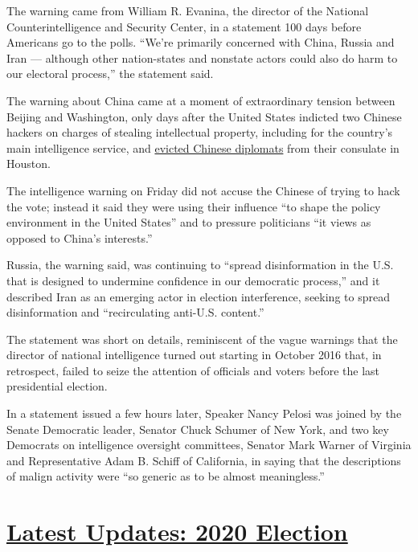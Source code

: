 The warning came from William R. Evanina, the director of the National
Counterintelligence and Security Center, in a statement 100 days before
Americans go to the polls. ``We're primarily concerned with China,
Russia and Iran --- although other nation-states and nonstate actors
could also do harm to our electoral process,'' the statement said.

The warning about China came at a moment of extraordinary tension
between Beijing and Washington, only days after the United States
indicted two Chinese hackers on charges of stealing intellectual
property, including for the country's main intelligence service, and
\href{https://www.nytimes.com/2020/07/22/world/asia/us-china-houston-consulate.html}{evicted
Chinese diplomats} from their consulate in Houston.

The intelligence warning on Friday did not accuse the Chinese of trying
to hack the vote; instead it said they were using their influence ``to
shape the policy environment in the United States'' and to pressure
politicians ``it views as opposed to China's interests.''

Russia, the warning said, was continuing to ``spread disinformation in
the U.S. that is designed to undermine confidence in our democratic
process,'' and it described Iran as an emerging actor in election
interference, seeking to spread disinformation and ``recirculating
anti-U.S. content.''

The statement was short on details, reminiscent of the vague warnings
that the director of national intelligence turned out starting in
October 2016 that, in retrospect, failed to seize the attention of
officials and voters before the last presidential election.

In a statement issued a few hours later, Speaker Nancy Pelosi was joined
by the Senate Democratic leader, Senator Chuck Schumer of New York, and
two key Democrats on intelligence oversight committees, Senator Mark
Warner of Virginia and Representative Adam B. Schiff of California, in
saying that the descriptions of malign activity were ``so generic as to
be almost meaningless.''

\hypertarget{latest-updates-2020-election}{%
\section{\texorpdfstring{\href{https://www.nytimes.com/2020/07/31/us/elections/biden-vs-trump.html?action=click\&pgtype=Article\&state=default\&region=MAIN_CONTENT_1\&context=storylines_live_updates}{Latest
Updates: 2020
Election}}{Latest Updates: 2020 Election}}\label{latest-updates-2020-election}}

